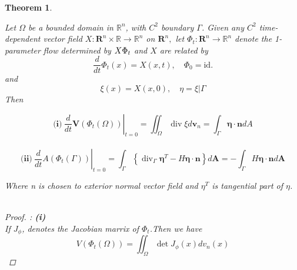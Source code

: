 \documentclass[oneside]{book}
\newtheorem{theorem}{Theorem}[section]
\begin{document}
	\begin{theorem}
		\label{t:3}
		
		
		
		
		
		
		
		
		
		
		
		
		
		
		Let $\Omega$ be a bounded domain in $\mathbb{R}^{n}$, with $C^{2}$ boundary $\Gamma$. Given
		any $C^{2}$ time-dependent vector field $X: \mathbf{R}^{n} \times \mathbb{R} \rightarrow \mathbb{R}^{n}$ on $\mathbf{R}^{n},$ let $\Phi_{t}: \mathbf{R}^{n} \rightarrow \mathbb{R}^{n}$
		denote the 1-parameter flow determined by $X\\ \Phi_{t}$ and $X$ are related by $$\frac{d}{d t} \Phi_{t}(x)=X(x, t), \quad \Phi_{0}=\mathrm{id.}$$
		and $$\xi(x)=X(x, 0), \quad \eta=\xi | \Gamma$$
		Then 
		
		
		\begin{equation}
		\label{eq23}
		{\textbf{(i)}}\ \left.\frac{d}{d t} \mathbf{V}\left(\Phi_{t}(\Omega)\right)\right|_{t=0}=\iint_{\Omega} \operatorname{div} \xi d \mathbf{v}_{n}=\int_{\Gamma} \boldsymbol{\eta} \cdot \mathbf{n} d A
		\end{equation}    
		\\
		
		
		
		
		
		
		
		\begin{equation}
		\label{eq24}
		{\textbf{(ii)}}\  \left.\frac{d}{d t} A\left(\Phi_{t}(\Gamma)\right)\right|_{t=0}=\int_{\Gamma}\left\{\operatorname{div}_{\Gamma} \boldsymbol{\eta}^{T}-H \boldsymbol{\eta} \cdot \mathbf{n}\right\} d \boldsymbol{A}=-\int_{\Gamma} H \boldsymbol{\eta} \cdot \mathbf{n} d \boldsymbol{A}
		\end{equation}
		
		
		
		Where n is chosen to exterior normal vector field and ${\eta}^{T}$ is tangential part of  $\eta$.\\\\
		
		
		\begin{proof}: \textbf{(i)}  \\
			If $J_{\phi}$, denotes the Jacobian marrix of $\Phi_{t}$.Then we have \\
			
			
			\begin{equation}
			\label{eq25}
			V\left(\Phi_{t}(\Omega)\right)=\iint_{\Omega} \operatorname{det} J_{\phi}(x) d v_{n}(x)
			\end{equation} 
			

\end{proof}
\end{theorem}
\end{document}
